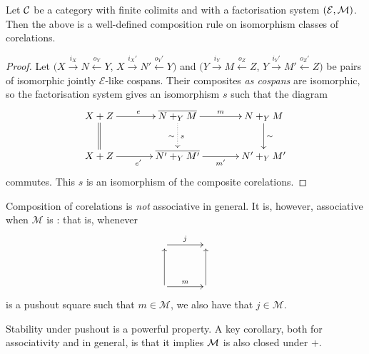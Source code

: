 \begin{proposition} \label{prop.corelcomp}
  Let $\mathcal C$ be a category with finite colimits and with a factorisation system
  $(\mathcal E,\mathcal M)$. Then the above is a well-defined composition rule on
  isomorphism classes of corelations.
\end{proposition}
\begin{proof}
  Let
  $(X \stackrel{i_X}{\longrightarrow} N \stackrel{o_Y}{\longleftarrow} Y$,
  $X \stackrel{i_X'}{\longrightarrow} N' \stackrel{o_Y'}{\longleftarrow} Y)$
  and
  $(Y \stackrel{i_Y}{\longrightarrow} M \stackrel{o_Z}{\longleftarrow} Z$, $Y
  \stackrel{i_Y'}{\longrightarrow} M' \stackrel{o_Z'}{\longleftarrow} Z)$
  be pairs of isomorphic jointly $\mathcal E$-like cospans. Their composites
  \emph{as cospans} 
  are isomorphic, so the factorisation system gives an isomorphism $s$ such that
  the diagram
  \[
    \xymatrixcolsep{3pc}
    \xymatrixrowsep{2pc}
    \xymatrix{
      X+Z \ar[r]^e \ar@{=}[d] & \overline{N+_YM} \ar[r]^m \ar@{.>}[d]^{s}_\sim & N+_YM
      \ar[d]^\sim \\
      X+Z \ar[r]_{e'}&\overline{N'+_YM'} \ar[r]_{m'} & N'+_YM'
    }
  \]
  commutes. This $s$ is an isomorphism of the composite corelations.
\end{proof}

Composition of corelations is \emph{not} associative in general. It is, however,
associative when $\mathcal M$ is : that is,
whenever
\[
  \xymatrixcolsep{3pc}
  \xymatrixrowsep{3pc}
  \xymatrix{
    \ar[r]^j & \\
    \ar[u] \ar[r]^m &  \ar[u]
  }
\]
is a pushout square such that $m \in \mathcal M$, we also have that $j \in
\mathcal M$. 

Stability under pushout is a powerful property. A key corollary, both for
associativity and in general, is that it implies $\mathcal M$ is also closed under
$+$. 

